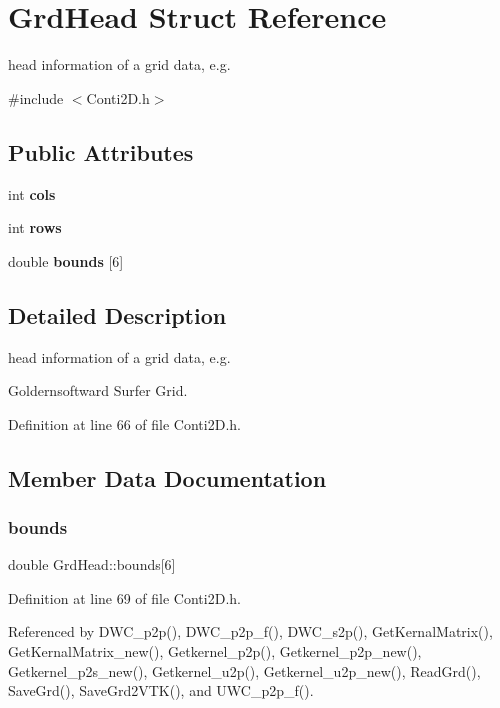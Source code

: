 \section{Grd\+Head Struct Reference}
\label{structGrdHead}


head information of a grid data, e.\+g.  




{\ttfamily \#include $<$Conti2\+D.\+h$>$}

\subsection*{Public Attributes}
\begin{DoxyCompactItemize}
\item 
int \textbf{ cols}
\item 
int \textbf{ rows}
\item 
double \textbf{ bounds} [6]
\end{DoxyCompactItemize}


\subsection{Detailed Description}
head information of a grid data, e.\+g. 

Goldernsoftward Surfer Grid. 

Definition at line 66 of file Conti2\+D.\+h.



\subsection{Member Data Documentation}
\mbox{\label{structGrdHead_af9e497ff0a1cd785f9628f820e702565_af9e497ff0a1cd785f9628f820e702565}} 
\subsubsection{bounds}
{\footnotesize\ttfamily double Grd\+Head\+::bounds[6]}



Definition at line 69 of file Conti2\+D.\+h.



Referenced by D\+W\+C\+\_\+p2p(), D\+W\+C\+\_\+p2p\+\_\+f(), D\+W\+C\+\_\+s2p(), Get\+Kernal\+Matrix(), Get\+Kernal\+Matrix\+\_\+new(), Getkernel\+\_\+p2p(), Getkernel\+\_\+p2p\+\_\+new(), Getkernel\+\_\+p2s\+\_\+new(), Getkernel\+\_\+u2p(), Getkernel\+\_\+u2p\+\_\+new(), Read\+Grd(), Save\+Grd(), Save\+Grd2\+V\+T\+K(), and U\+W\+C\+\_\+p2p\+\_\+f().

